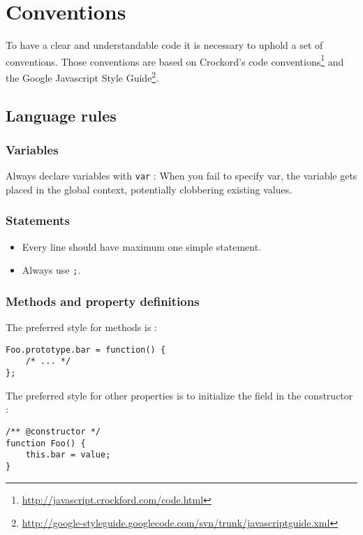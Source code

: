 \section{Conventions}

To have a clear and understandable code it is necessary to uphold a set of conventions.
Those conventions are based on Crockord's code conventions\footnote{\url{http://javascript.crockford.com/code.html}} 
and the Google Javascript Style Guide\footnote{\url{http://google-styleguide.googlecode.com/svn/trunk/javascriptguide.xml}}.

\subsection{Language rules}

\subsubsection{Variables}

Always declare variables with \lstinline{var} : When you fail to specify var, the variable gets placed in the global context, potentially clobbering existing values.

\subsubsection{Statements}

\begin{itemize}
  \item Every line should have maximum one simple statement.
  \item Always use \lstinline{;}.
\end{itemize}

\subsubsection{Methods and property definitions}

The preferred style for methods is :
\begin{lstlisting}
Foo.prototype.bar = function() {
    /* ... */
};
\end{lstlisting}

The preferred style for other properties is to initialize the field in the constructor :
\begin{lstlisting}
/** @constructor */
function Foo() {
    this.bar = value;
}
\end{lstlisting}

